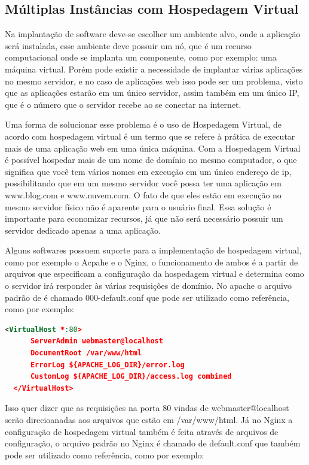 \subsection{Múltiplas Instâncias com Hospedagem Virtual}

Na implantação de software deve-se escolher um ambiente alvo, onde a aplicação
será instalada, esse ambiente deve possuir um nó, que é um recurso computacional
onde se implanta um componente, como por exemplo: uma máquina virtual. Porém pode
existir a necessidade de implantar várias aplicações no mesmo servidor, e no caso
de aplicações web isso pode ser um problema, visto que as aplicações estarão em um
único servidor, assim também em um único IP, que é o número que o servidor recebe
ao se conectar na internet.

Uma forma de solucionar esse problema é o uso de Hospedagem Virtual, de acordo com
\cite{apachevh} hospedagem virtual é um termo que se refere à prática de executar
mais de uma aplicação web em uma única máquina. Com a Hospedagem Virtual é possível
hospedar mais de um nome de domínio no mesmo computador, o que significa que você
tem vários nomes em execução em um único endereço de ip, possibilitando que em um
mesmo servidor você possa ter uma aplicação em www.blog.com e www.nuvem.com. O fato
de que eles estão em execução no mesmo servidor físico não é aparente para o usuário final. Essa
solução é importante para economizar recursos, já que não será necessário possuir
um servidor dedicado apenas a uma aplicação.

Alguns softwares possuem suporte para a implementação de hospedagem virtual, como por
exemplo o Acpahe e o Nginx, o funcionamento de ambos é a partir de arquivos que
especificam a configuração da hospedagem virtual e determina como o servidor
irá responder às várias requisições de domínio. No apache o arquivo padrão de
é chamado 000-default.conf que pode ser utilizado como referência, como por exemplo:

\begin{lstlisting}[language=Xml,label=dice_index,caption={Exemplo de arquivo de configuração de hospedagem virtual no apache}]
  <VirtualHost *:80>
      ServerAdmin webmaster@localhost
      DocumentRoot /var/www/html
      ErrorLog ${APACHE_LOG_DIR}/error.log
      CustomLog ${APACHE_LOG_DIR}/access.log combined
  </VirtualHost>
\end{lstlisting}

Isso quer dizer que as requisições na porta 80 vindas de webmaster@localhost serão
direcioanadas aos arquivos que estão em /var/www/html. Já no Nginx a configuração
de hospedagem virtual também é feita através de arquivos de configuração, o arquivo
padrão no Nginx é chamado de default.conf que também pode ser utilizado como
referência, como por exemplo:

